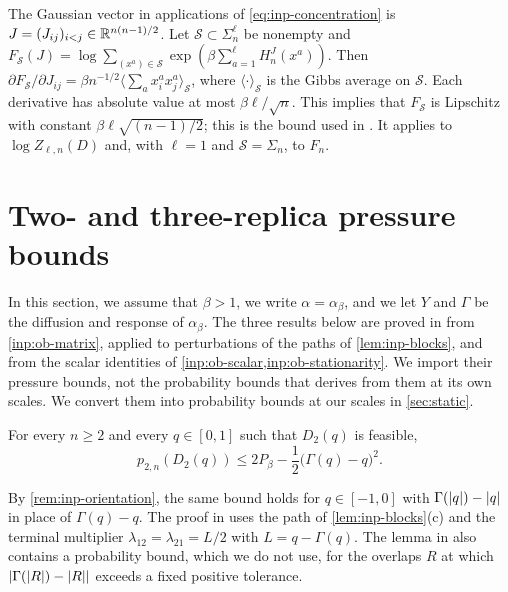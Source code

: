 \begin{remark}\label{rem:inp-lipschitz}
The Gaussian vector in applications of \eqref{eq:inp-concentration} is
$J=(J_{ij})_{i<j}\in\mathbb R^{n(n-1)/2}$. Let $\mathcal S\subset\Sigma_n^\ell$ be
nonempty and $F_{\mathcal S}(J)=\log\sum_{(x^a)\in\mathcal
S}\exp(\beta\sum_{a=1}^\ell H_n^J(x^a))$. Then $\partial F_{\mathcal S}/\partial
J_{ij}=\beta n^{-1/2}\langle\sum_ax^a_ix^a_j\rangle_{\mathcal S}$, where
$\langle\cdot\rangle_{\mathcal S}$ is the Gibbs average on $\mathcal S$. Each
derivative has absolute value at most $\beta\ell/\sqrt n$. This implies that
$F_{\mathcal S}$ is Lipschitz with constant $\beta\ell\sqrt{(n-1)/2}$; this is the bound used in
\cite[proof of Lemma~4.2]{oai-barriers}. It applies to $\log Z_{\ell,n}(D)$ and,
with $\ell=1$ and $\mathcal S=\Sigma_n$, to $F_n$.
\end{remark}

\section{Two- and three-replica pressure bounds}\label{sec:inp-three}

In this section, we assume that $\beta>1$, we write $\alpha=\alpha_\beta$, and we let $Y$
and $\Gamma$ be the diffusion and response of $\alpha_\beta$. The three results below are proved in
\cite[Sections~4 and~7]{oai-barriers} from \cref{inp:ob-matrix}, applied to
perturbations of the paths of \cref{lem:inp-blocks}, and from the scalar
identities of \cref{inp:ob-scalar,inp:ob-stationarity}. We import their pressure
bounds, not the probability bounds that \cite{oai-barriers} derives from them at
its own scales. We convert them into probability bounds at our scales in
\cref{sec:static}.

\begin{proposition}\label{inp:ob-pair-gap}
For every $n\ge2$ and every $q\in[0,1]$ such that $D_2(q)$ is feasible,
\[
 p_{2,n}(D_2(q))\le2P_\beta-\frac12\bigl(\Gamma(q)-q\bigr)^2.
\]
\end{proposition}

By \cref{rem:inp-orientation}, the same bound holds for $q\in[-1,0]$ with
$\Gamma(\lvert q\rvert)-\lvert q\rvert$ in place of $\Gamma(q)-q$. The proof in
\cite{oai-barriers} uses the path of \cref{lem:inp-blocks}(c) and the terminal
multiplier $\lambda_{12}=\lambda_{21}=L/2$ with $L=q-\Gamma(q)$. The lemma in
\cite{oai-barriers} also contains a probability bound, which we do not use, for
the overlaps $R$ at which $\lvert \Gamma(\lvert R\rvert)-\lvert R\rvert\rvert$ exceeds a fixed
positive tolerance.

